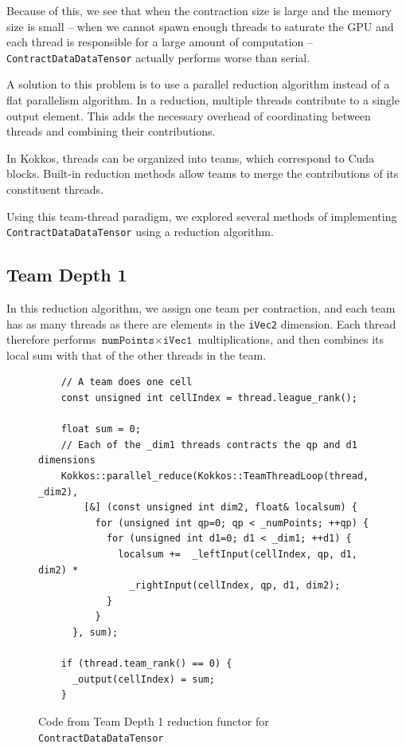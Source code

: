 Because of this, we see that when the contraction size is large and the memory
size is small -- when we cannot spawn enough threads to saturate the GPU and
each thread is responsible for a large amount of computation --
\texttt{ContractDataDataTensor} actually performs worse than serial.

A solution to this problem is to use a parallel reduction algorithm instead of
a flat parallelism algorithm.  In a reduction, multiple threads contribute to a
single output element.  This adds the necessary overhead of coordinating
between threads and combining their contributions.

In Kokkos, threads can be organized into teams, which correspond to Cuda
blocks.  Built-in reduction methods allow teams to merge the contributions of
its constituent threads.

Using this team-thread paradigm, we explored several methods of implementing
\texttt{ContractDataDataTensor} using a reduction algorithm.

\subsection{Team Depth 1}
    In this reduction algorithm, we assign one team per contraction, and each
    team has as many threads as there are elements in the \texttt{iVec2}
    dimension.  Each thread therefore performs $\texttt{numPoints} \times
    \texttt{iVec1}$ multiplications, and then combines its local sum with that
    of the other threads in the team.


\begin{figure}[ht]
    \begin{lstlisting}
    // A team does one cell
    const unsigned int cellIndex = thread.league_rank();

    float sum = 0;
    // Each of the _dim1 threads contracts the qp and d1 dimensions
    Kokkos::parallel_reduce(Kokkos::TeamThreadLoop(thread, _dim2),
        [&] (const unsigned int dim2, float& localsum) {
          for (unsigned int qp=0; qp < _numPoints; ++qp) {
            for (unsigned int d1=0; d1 < _dim1; ++d1) {
              localsum +=  _leftInput(cellIndex, qp, d1, dim2) *
                _rightInput(cellIndex, qp, d1, dim2);
            }
          }
      }, sum);

    if (thread.team_rank() == 0) {
      _output(cellIndex) = sum;
    }
 \end{lstlisting}
\caption{Code from Team Depth 1 reduction functor for \texttt{ContractDataDataTensor}
\label{lst:ContractDataDataTensorDepth1Functor}} 
\end{figure}

